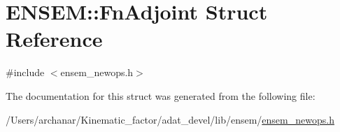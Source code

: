 \hypertarget{structENSEM_1_1FnAdjoint}{}\section{E\+N\+S\+EM\+:\+:Fn\+Adjoint Struct Reference}
\label{structENSEM_1_1FnAdjoint}


{\ttfamily \#include $<$ensem\+\_\+newops.\+h$>$}



The documentation for this struct was generated from the following file\+:\begin{DoxyCompactItemize}
\item 
/\+Users/archanar/\+Kinematic\+\_\+factor/adat\+\_\+devel/lib/ensem/\mbox{\hyperlink{lib_2ensem_2ensem__newops_8h}{ensem\+\_\+newops.\+h}}\end{DoxyCompactItemize}
